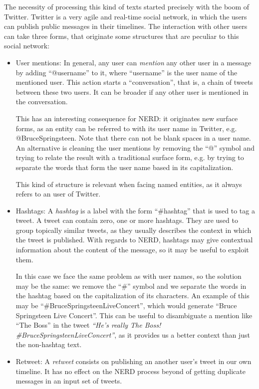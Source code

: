 The necessity of processing this kind of texts started precisely with the boom of Twitter. Twitter is a very agile and real-time social network, in which the users can publish public messages in their timelines. The interaction with other users can take three forms, that originate some structures that are peculiar to this social network:

\begin{itemize}
\item User mentions: In general, any user can \emph{mention} any other user in a message by adding ``@username'' to it, where ``username'' is the user name of the mentioned user. This action starts a ``conversation'', that is, a chain of tweets between these two users. It can be broader if any other user is mentioned in the conversation. 

This has an interesting  consequence for NERD: it originates new surface forms, as an entity can be referred to with its user name in Twitter, e.g. @BruceSpringsteen. Note that there can not be blank spaces in a user name. An alternative is cleaning the user mentions by removing the ``@'' symbol and trying to relate the result with a traditional surface form, e.g. by trying to separate the words that form the user name based in its capitalization.

This kind of structure is relevant when facing named entities, as it always refers to an user of Twitter.

\item Hashtags: A \emph{hashtag} is a label with the form ``\#hashtag'' that is used to tag a tweet. A tweet can contain zero, one or more hashtags. They are used to group topically similar tweets, as they usually describes the context in which the tweet is published. With regards to NERD, hashtags may give contextual information about the content of the message, so it may be useful to exploit them.

In this case we face the same problem as with user names, so the solution may be the same: we remove the ``\#'' symbol and we separate the words in the hashtag based on the capitalization of its characters. An example of this may be ``\#BruceSpringsteenLiveConcert'', which would generate ``Bruce Springsteen Live Concert''. This can be useful to disambiguate a mention like ``The Boss'' in the tweet \textit{``He's really The Boss! \#BruceSpringsteenLiveConcert''}, as it provides us a better context than just the non-hashtag text.

\item Retweet: A \emph{retweet} consists on publishing an another user's tweet in our own timeline. It has no effect on the NERD process beyond of getting duplicate messages in an input set of tweets.
\end{itemize}


